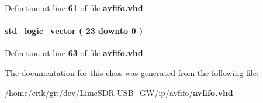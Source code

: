Definition at line {\bf 61} of file {\bf avfifo.\+vhd}.

\paragraph[{zeroes24}]{ {\bfseries \textcolor{comment}{std\+\_\+logic\+\_\+vector}\textcolor{vhdlchar}{ }\textcolor{vhdlchar}{(}\textcolor{vhdlchar}{ }\textcolor{vhdlchar}{ } \textcolor{vhdldigit}{23} \textcolor{vhdlchar}{ }\textcolor{keywordflow}{downto}\textcolor{vhdlchar}{ }\textcolor{vhdlchar}{ } \textcolor{vhdldigit}{0} \textcolor{vhdlchar}{ }\textcolor{vhdlchar}{)}\textcolor{vhdlchar}{ }} \hspace{0.3cm}{\ttfamily [Signal]}}\label{classavfifo_1_1avfifo__arch_add5952af13f8a102391396fb7aef373d}


Definition at line {\bf 63} of file {\bf avfifo.\+vhd}.



The documentation for this class was generated from the following file\+:\begin{DoxyCompactItemize}
\item 
/home/erik/git/dev/\+Lime\+S\+D\+R-\/\+U\+S\+B\+\_\+\+G\+W/ip/avfifo/{\bf avfifo.\+vhd}\end{DoxyCompactItemize}
